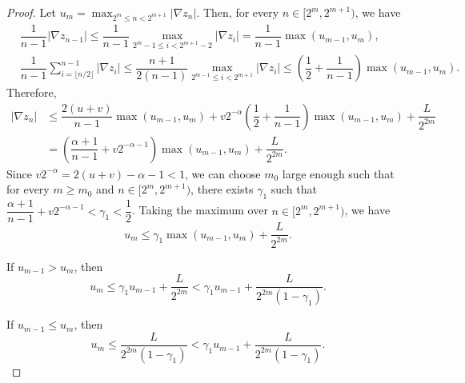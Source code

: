 \begin{proof}
  Let $u_m = \max_{2^m \le n < 2^{m+1}} |\nabla z_n|$. Then, for every $n\in [2^m, 2^{m+1})$, we have
  \begin{align*}
     & \dfrac{1}{n-1}|\nabla z_{n-1}| \le \dfrac{1}{n-1}\max_{2^m-1\le i < 2^{m+1}-2}|\nabla z_i| = \dfrac{1}{n-1}\max(u_{m-1},u_m),                                                                      \\
     & \dfrac{1}{n-1}\sum_{i=\lfloor n/2\rfloor}^{n-1}|\nabla z_{i}| \le \dfrac{n+1}{2(n-1)}\max_{2^{m-1}\le i < 2^{m+1}} |\nabla z_i| \le \left(\dfrac{1}{2}+\dfrac{1}{n-1}\right) \max(u_{m-1}, u_{m}).
  \end{align*}
  Therefore,
  \begin{align*}
    |\nabla z_{n}|
     & \le \dfrac{2(u+v)}{n-1}\max(u_{m-1},u_m) + v2^{-\alpha}\left(\dfrac{1}{2}+\dfrac{1}{n-1}\right)\max(u_{m-1}, u_m) + \dfrac{L}{2^{2m}} \\
     & = \left(\dfrac{\alpha+1}{n-1}+ v2^{-\alpha-1}\right)\max(u_{m-1}, u_m) + \dfrac{L}{2^{2m}}.
  \end{align*}
  Since $v2^{-\alpha} = 2(u+v)-\alpha-1 < 1$, we can choose $m_0$ large enough such that for every $m\ge m_0$ and $n\in [2^m, 2^{m+1})$, there exists $\gamma_1$ such that $\dfrac{\alpha+1}{n-1}+ v2^{-\alpha-1} < \gamma_1 < \dfrac{1}{2}$. Taking the maximum over $n\in [2^m, 2^{m+1})$, we have
  $$u_m \le \gamma_1\max(u_{m-1}, u_m) + \dfrac{L}{2^{2m}}.$$

  If $u_{m-1} > u_m$, then
  $$u_m \le \gamma_1 u_{m-1} + \dfrac{L}{2^{2m}} < \gamma_1 u_{m-1} + \dfrac{L}{2^{2m}(1-\gamma_1)}.$$

  If $u_{m-1} \le u_m$, then
  $$u_m \le \dfrac{L}{2^{2m}(1-\gamma_1)} < \gamma_1 u_{m-1} + \dfrac{L}{2^{2m}(1-\gamma_1)}.$$


\end{proof}
